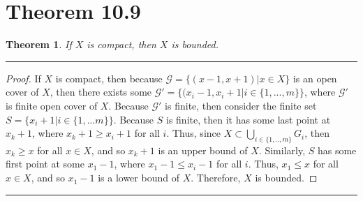 \documentclass[openany, amssymb, psamsfonts]{amsart}
\newtheorem{thm}{Theorem}[section]
\theoremstyle{definition}
\numberwithin{equation}{section}
\begin{document}
\section*{Theorem 10.9}
\begin{thm}  \label{10.9} If $X$ is compact, then $X$ is bounded.
\end{thm}
\vspace{4pt}     \hrule   \vspace{4pt} \begin{proof}
If $X$ is compact, then because $\mathcal{G} = \{(x-1, x+1)|x\in X\}$ is an open cover of $X$, then there exists some $\mathcal{G'} = \{(x_i-1,x_i+1|i\in \{1,...,m\}\}$, where $\mathcal{G'}$ is finite open cover of $X$. Because $\mathcal{G'}$ is finite, then consider the finite set $S = \{x_i+1|i\in \{1,...m\}\}$. Because $S$ is finite, then it has some last point at $x_k+1$, where $x_k+1\geq x_i+1$ for all $i$. Thus, since $X\subset \bigcup_{i\in \{1,..,m\}} G_i$, then $x_k\geq x$ for all $x\in X$, and so $x_k+1$ is an upper bound of $X$. Similarly, $S$ has some first point at some $x_1-1$, where $x_1-1\leq x_i-1$ for all $i$. Thus, $x_1\leq x$ for all $x\in X$, and so $x_1-1$ is a lower bound of $X$. Therefore, $X$ is bounded.
\end{proof}\vspace{4pt}     \hrule   \vspace{4pt}
\end{document}
